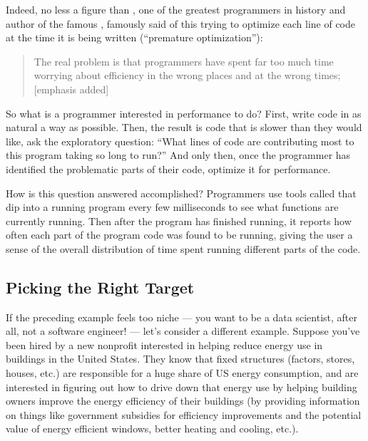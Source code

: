 \documentclass[letterpaper,10pt,english]{jupyterBook}
\begin{document}
\sphinxAtStartPar
Indeed, no less a figure than , one of the greatest programmers in history and author of the famous , famously said of this trying to optimize each line of code at the time it is being written (“premature optimization”):
\begin{quote}

\sphinxAtStartPar
The real problem is that programmers have spent far too much time worrying about efficiency in the wrong places and at the wrong times;  {[}emphasis added{]}
\end{quote}

\sphinxAtStartPar
So what is a programmer interested in performance to do? First, write code in as natural a way as possible. Then,  the result is code that is slower than they would like, ask the exploratory question: “What lines of code are contributing most to this program taking so long to run?” And only then, once the programmer has identified the problematic parts of their code, optimize it for performance.

\sphinxAtStartPar
How is this question answered accomplished? Programmers use tools called  that dip into a running program every few milliseconds to see what functions are currently running. Then after the program has finished running, it reports how often each part of the program code was found to be running, giving the user a sense of the overall distribution of time spent running different parts of the code.


\subsection{Picking the Right Target}
\label{\detokenize{30_questions/10_using_exploratory_questions:picking-the-right-target}}
\sphinxAtStartPar
If the preceding example feels too niche — you want to be a data scientist, after all, not a software engineer! — let’s consider a different example. Suppose you’ve been hired by a new non\sphinxhyphen{}profit interested in helping reduce energy use in buildings in the United States. They know that fixed structures (factors, stores, houses, etc.) are responsible for a huge share of US energy consumption, and are interested in figuring out how to drive down that energy use by helping building owners improve the energy efficiency of their buildings (by providing information on things like government subsidies for efficiency improvements and the potential value of energy efficient windows, better heating and cooling, etc.).
\end{document}
